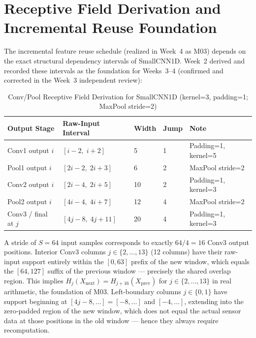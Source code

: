 \documentclass[11pt,oneside,a4paper]{report}
\newcommand{\code}[1]{{\small\upshape\ttfamily #1}}
\theoremstyle{remark}
\begin{document}
\section{Receptive Field Derivation and Incremental Reuse Foundation}
The incremental feature reuse schedule (realized in Week~4 as \code{M03}) depends on the exact structural dependency intervals of \code{SmallCNN1D}. Week~2 derived and recorded these intervals as the foundation for Weeks~3--4 (confirmed and corrected in the Week~3 independent review):

\begin{table}[htbp]
\centering\small
\caption{Conv/Pool Receptive Field Derivation for \code{SmallCNN1D} (kernel=3, padding=1; MaxPool stride=2)}\label{tab:rf}
\begin{tabularx}{\textwidth}{@{}lllll@{}}
\toprule
\textbf{Output Stage} & \textbf{Raw-Input Interval} & \textbf{Width} & \textbf{Jump} & \textbf{Note} \\
\midrule
Conv1 output $i$ & $[i-2,\; i+2]$ & 5 & 1 & Padding=1, kernel=5 \\
Pool1 output $i$ & $[2i-2,\; 2i+3]$ & 6 & 2 & MaxPool stride=2 \\
Conv2 output $i$ & $[2i-4,\; 2i+5]$ & 10 & 2 & Padding=1, kernel=3 \\
Pool2 output $i$ & $[4i-4,\; 4i+7]$ & 12 & 4 & MaxPool stride=2 \\
Conv3 / final at $j$ & $[4j-8,\; 4j+11]$ & 20 & 4 & Padding=1, kernel=3 \\
\bottomrule
\end{tabularx}
\end{table}

A stride of $S=64$ input samples corresponds to exactly $64/4 = 16$ Conv3 output positions. Interior Conv3 columns $j \in \{2,\ldots,13\}$ (12 columns) have their raw-input support entirely within the $[0,63]$ prefix of the new window, which equals the $[64,127]$ suffix of the previous window --- precisely the shared overlap region. This implies $H_j(X_{\text{next}}) = H_{j+16}(X_{\text{prev}})$ for $j \in \{2,\ldots,13\}$ in real arithmetic, the foundation of \code{M03}. Left-boundary columns $j \in \{0,1\}$ have support beginning at $[4j{-}8,\ldots] = [-8,\ldots]$ and $[-4,\ldots]$, extending into the zero-padded region of the new window, which does not equal the actual sensor data at those positions in the old window --- hence they always require recomputation.
\end{document}
